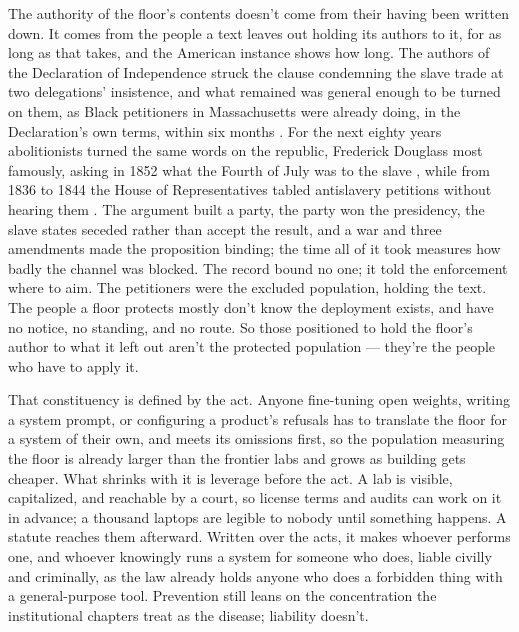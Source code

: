 
The authority of the floor's contents doesn't come from their having been written down. It comes from the people a text leaves out holding its authors to it, for as long as that takes, and the American instance shows how long. The authors of the Declaration of Independence struck the clause condemning the slave trade at two delegations' insistence, and what remained was general enough to be turned on them, as Black petitioners in Massachusetts were already doing, in the Declaration's own terms, within six months \autocite{loc2010declaration,hall1777petition}. For the next eighty years abolitionists turned the same words on the republic, Frederick Douglass most famously, asking in 1852 what the Fourth of July was to the slave \autocite{douglass1852fourth}, while from 1836 to 1844 the House of Representatives tabled antislavery petitions without hearing them \autocite{nara1989gagrule}. The argument built a party, the party won the presidency, the slave states seceded rather than accept the result, and a war and three amendments made the proposition binding; the time all of it took measures how badly the channel was blocked. The record bound no one; it told the enforcement where to aim. The petitioners were the excluded population, holding the text.
The people a floor protects mostly don't know the deployment exists, and have no notice, no standing, and no route. So those positioned to hold the floor's author to what it left out aren't the protected population — they're the people who have to apply it.

That constituency is defined by the act. Anyone fine-tuning open weights, writing a system prompt, or configuring a product's refusals has to translate the floor for a system of their own, and meets its omissions first, so the population measuring the floor is already larger than the frontier labs and grows as building gets cheaper. What shrinks with it is leverage before the act. A lab is visible, capitalized, and reachable by a court, so license terms and audits can work on it in advance; a thousand laptops are legible to nobody until something happens. A statute reaches them afterward. Written over the acts, it makes whoever performs one, and whoever knowingly runs a system for someone who does, liable civilly and criminally, as the law already holds anyone who does a forbidden thing with a general-purpose tool. Prevention still leans on the concentration the institutional chapters treat as the disease; liability doesn't.

